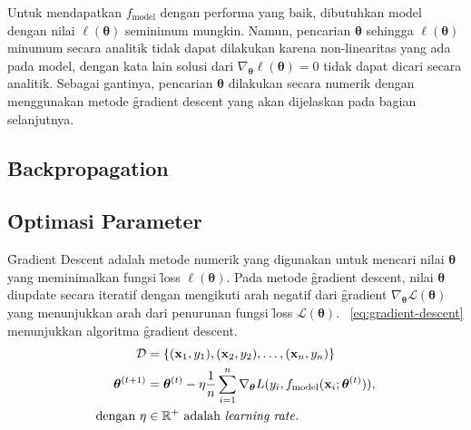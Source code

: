     Untuk mendapatkan $f_\text{model}$ dengan performa yang baik, dibutuhkan model dengan nilai $\ell(\bm{\theta})$ seminimum mungkin. Namun, pencarian $\bm{\theta}$ sehingga $ \ell (\bm{\theta})$ minumum secara analitik tidak dapat dilakukan karena non-linearitas yang ada pada model, dengan kata lain solusi dari $\nabla_{\bm{\theta}} \ell(\bm{\theta}) = 0$ tidak dapat dicari secara analitik. Sebagai gantinya, pencarian $\bm{\theta}$ dilakukan secara numerik dengan menggunakan metode \f{gradient descent} yang akan dijelaskan pada bagian selanjutnya.
    
    \subsection{\f{Backpropagation}}

    \subsection{\f{Optimasi} Parameter}

    \f{Gradient Descent} adalah metode numerik yang digunakan untuk mencari nilai $\bm{\theta}$ yang meminimalkan fungsi \f{loss} $\ell(\bm{\theta})$. Pada metode \f{gradient descent}, nilai $\bm{\theta}$ diupdate secara iteratif dengan mengikuti arah negatif dari \f{gradient} $\nabla_{\bm{\theta}} \mathcal{L}(\bm{\theta})$ yang menunjukkan arah dari penurunan fungsi \f{loss} $\mathcal{L}(\bm{\theta})$. \equ~\ref{eq:gradient-descent} menunjukkan algoritma \f{gradient descent}.
    \begin{align}
        \mathcal{D} &= \{(\mathbf{x}_1, y_1), (\mathbf{x}_2, y_2), \dots, (\mathbf{x}_n, y_n)\} \\
        \label{eq:gradient-descent}
        \bm{\theta}^{(t+1)} &= \bm{\theta}^{(t)} - \eta \frac{1}{n} \sum_{i=1}^{n} \nabla_{\bm{\theta}} L(y_i, f_{\text{model}}(\mathbf{x}_i; \bm{\theta}^{(t)})), \\
        \text{dengan } \eta &\in \mathbb{R}^+ \text{ adalah \textit{learning rate}}.
    \end{align}

